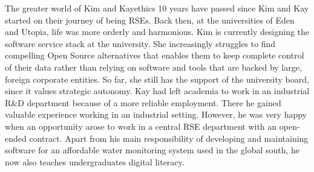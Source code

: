 \documentclass{eceasst}
\begin{document}
\begin{story}{The greater world of Kim and Kay}{ethics}
10 years have passed since Kim and Kay started on their journey of being RSEs. Back then,
at the universities of Eden and Utopia, life was more orderly and harmonious.
Kim is currently designing the software service stack at the university.
She increasingly struggles to find compelling Open Source alternatives that enables them to keep complete control of their data
rather than relying on software and tools that are backed by large, foreign corporate entities.
So far, she still has the support of the university board, since it values strategic autonomy.
Kay had left academia to work in an industrial R\&D department because of a more reliable employment.
There he gained valuable experience working in an industrial setting.
However, he was very happy when an opportunity arose to work in a central
RSE department with an open-ended contract. Apart from his main responsibility
of developing and maintaining software for an affordable water monitoring system
used in the global south, he now also teaches undergraduates digital literacy.
\end{story}
\end{document}
